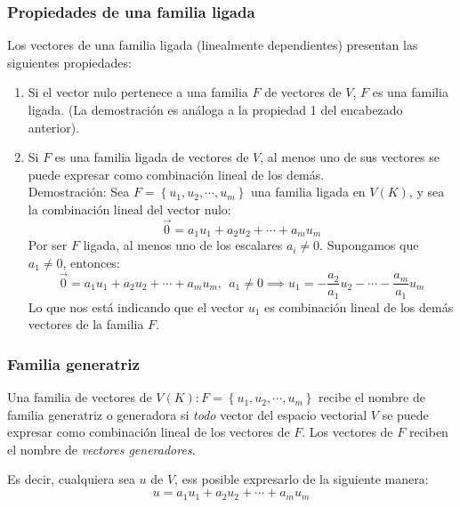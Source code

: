\subsubsection{Propiedades de una familia ligada}

Los vectores de una familia ligada (linealmente dependientes) presentan las siguientes propiedades:
\begin{enumerate}
  \item Si el vector nulo pertenece a una familia \(F\) de vectores de \(V\), \(F\) es una familia ligada. (La demostración es análoga a la propiedad 1 del encabezado anterior).
  \item Si \(F\) es una familia ligada de vectores de \(V\), al menos uno de sus vectores se puede expresar como combinación lineal de los demás. \\ Demostración: Sea \(F=\left\{u_1, u_2, \cdots, u_m\right\}\) una familia ligada en \(V(K)\), y sea la combinación lineal del vector nulo:\[
    \vec{0} = a_1 u_1 + a_2 u_2 + \cdots + a_m u_m
  \]
  Por ser \(F\) ligada, al menos uno de los escalares \(a_i \neq 0\). Supongamos que \(a_1 \neq 0\), entonces: \[
    \vec{0} = a_1 u_1 + a_2 u_2 + \cdots + a_m u_m, ~~ a_1 \neq 0 \implies u_1 = -\frac{a_2}{a_1}u_2 - \cdots - \frac{a_m}{a_1}u_m
  \]
  Lo que nos está indicando que el vector \(u_1\) es combinación lineal de los demás vectores de la familia \(F\).
\end{enumerate}

\subsubsection{Familia generatriz}

Una familia de vectores de \(V(K): F=\left\{u_1,u_2,\cdots,u_m\right\}\) recibe el nombre de familia generatriz o generadora si \textit{todo} vector del espacio vectorial \(V\) se puede expresar como combinación lineal de los vectores de \(F\). Los vectores de \(F\) reciben el nombre de \textit{vectores generadores}.

Es decir, cualquiera sea \(u\) de \(V\), ess posible expresarlo de la siguiente manera:\[
  u = a_1 u_1 + a_2 u_2 + \cdots + a_m u_m
\]



